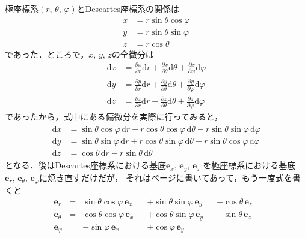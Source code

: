 極座標系$(r, \, \theta , \, \varphi)$とDescartes座標系の関係は
\begin{align*}
x & = r \sin \theta \cos \varphi \\
y & = r \sin \theta \sin \varphi \\
z & = r \cos \theta
\end{align*}
であった．ところで，$x, \, y, \, z$の全微分は
\begin{align*}
\mathrm{d}x & = \frac{\partial x} {\partial r} \mathrm{d} r 
+ \frac{\partial x} {\partial \theta} \mathrm{d} \theta 
+ \frac{\partial x} {\partial \varphi} \mathrm{d} \varphi \\
\mathrm{d}y & = \frac{\partial y} {\partial r} \mathrm{d} r 
+ \frac{\partial y} {\partial \theta} \mathrm{d} \theta 
+ \frac{\partial y} {\partial \varphi} \mathrm{d} \varphi \\
\mathrm{d}z & = \frac{\partial z} {\partial r} \mathrm{d} r 
+ \frac{\partial z} {\partial \theta} \mathrm{d} \theta 
+ \frac{\partial z} {\partial \varphi} \mathrm{d} \varphi 
\end{align*}
であったから，式中にある偏微分を実際に行ってみると，
\begin{align}
\begin{aligned}
\mathrm{d} x & = \sin \theta \cos \varphi \, \mathrm{d} r 
 + r \cos \theta \cos \varphi \, \mathrm{d} \theta 
 - r \sin \theta \sin \varphi \, \mathrm{d} \varphi \\
\mathrm{d} y & = \sin\theta \sin \varphi \, \mathrm{d}r
 + r \cos \theta \sin \varphi \, \mathrm{d}\theta 
 + r \sin \theta \cos \varphi \, \mathrm{d} \varphi \\
\mathrm{d} z & = \cos \theta \, \mathrm{d} r  - r \sin \theta \, \mathrm{d} \theta
\label{eq:Deckyokubibun}
\end{aligned}
\end{align}
となる．後はDescartes座標系における基底$\bm{e}_x, \, \bm{e}_y, \, \bm{e}_z$
を極座標系における基底$\bm{e}_r, \, \bm{e}_\theta, \, \bm{e}_\varphi$に焼き直すだけだが，
それは\pageref{eq:kyokuDeckitei}ページに書いてあって，もう一度式を書くと
\begin{align*}
\bm{e}_r & = & \sin \theta \cos \varphi \, \bm{e}_x & & + \sin \theta \sin \varphi \, \bm{e}_y &
& + \cos \theta \, \bm{e}_z & \\
\bm{e}_\theta & = & \cos \theta \cos \varphi \, \bm{e}_x & & + \cos \theta \sin \varphi \, \bm{e}_y & 
& -  \sin \theta \,  \bm{e}_z & \\
\bm{e}_\varphi & = & - \sin \varphi \, \bm{e}_x & & + \cos \varphi \, \bm{e}_y &
\end{align*}
